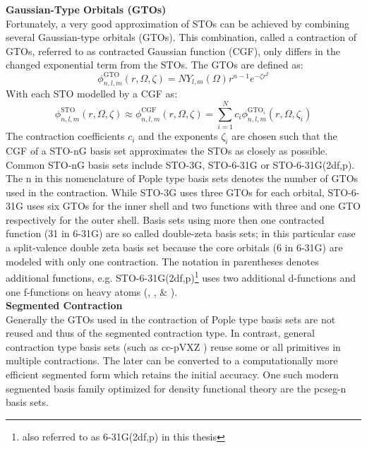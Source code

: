 \textbf{Gaussian-Type Orbitals (GTOs)}\\
Fortunately, a very good approximation of STOs can be achieved by combining several Gaussian-type orbitals (GTOs). This combination, called a contraction of GTOs, referred to as contracted Gaussian function (CGF), only differs in the changed exponential term from the STOs. The GTOs are defined as:
\begin{equation}
    \label{eq:gaussian_orbital}
    \phi_{n, l, m}^{\text{GTO}}(r, \Omega, \zeta) = N Y_{l,m}(\Omega) r^{n-1} e^{-\zeta r^2}
\end{equation}
With each STO modelled by a CGF as: 
\begin{equation}
    \phi_{n, l, m}^{\text{STO}}(r, \Omega, \zeta)  \approx \phi_{n, l, m}^{\text{CGF}}(r, \Omega, \zeta) = \sum_{i=1}^N c_i \phi_{n, l, m}^{\text{GTO}_i}(r, \Omega, \zeta_i)
\end{equation}
The contraction coefficients $c_i$ and the exponents $\zeta_i$ are chosen such that the CGF of a STO-nG basis set approximates the STOs as closely as possible. Common STO-nG basis sets include STO-3G, STO-6-31G or STO-6-31G(2df,p). \\
The n in this nomenclature of Pople type basis sets \parencite{ref:pople_basis} denotes the number of GTOs used in the contraction. While STO-3G uses three GTOs for each orbital, STO-6-31G uses six GTOs for the inner shell and two functions with three and one GTO respectively for the outer shell. Basis sets using more then one contracted function (31 in 6-31G) are so called double-zeta basis sets; in this particular case a split-valence double zeta basis set because the core orbitals (6 in 6-31G) are modeled with only one contraction. The notation in parentheses denotes additional functions, e.g. STO-6-31G(2df,p)\footnote{also referred to as 6-31G(2df,p) in this thesis} uses two additional d-functions and one f-functions on heavy atoms (, ,  \& ). \\

\textbf{Segmented Contraction}\\
Generally the GTOs used in the contraction of Pople type basis sets are not reused and thus of the segmented contraction type. In contrast, general contraction type basis sets (such as cc-pVXZ \parencite{ref:cc-pVXZ}) reuse some or all primitives in multiple contractions. The later can be converted to a computationally more efficient segmented form which retains the initial accuracy. One such modern segmented basis family optimized for density functional theory are the pcseg-n basis sets. \parencite{ref:Jensen2014pcs}\\

